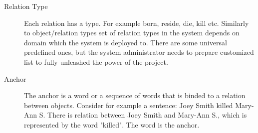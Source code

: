 \begin{description}
\item[Relation Type]
Each relation has a type. For example born, reside, die, kill etc. Similarly to
object/relation types set of relation types in the system depends on domain
which the system is deployed to. There are some universal predefined ones, but
the system administrator needs to prepare customized list to fully unleashed the
power of the project.

\item[Anchor]
The anchor is a word or a sequence of words that is binded to a relation between
objects. Consider for example a sentence: Joey Smith killed Mary-Ann S. There is
relation between Joey Smith and Mary-Ann S., which is represented by the word
"killed". The word is the anchor.
\end{description}

